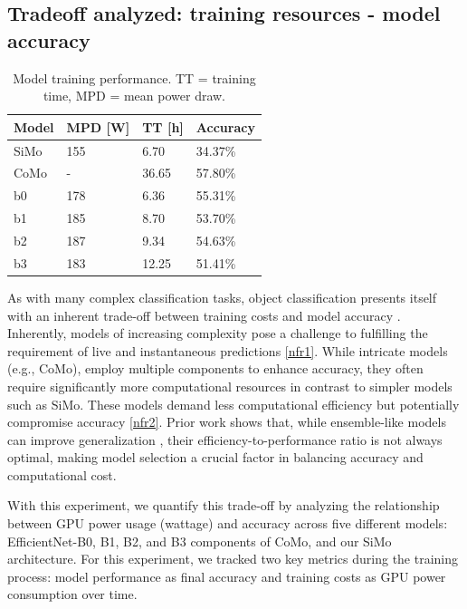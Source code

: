 \subsection{Tradeoff analyzed: training resources - model accuracy}\label{sec:experiments:exp1}

\begin{table}[t]
\centering
\caption{Model training performance. TT = training time, MPD = mean power draw.}
\label{tab:eval:power-stuff}
\begin{tabularx}{\linewidth} {XXXX}
    \toprule
    Model & MPD [W] & TT [h] & Accuracy \\
    \midrule
    SiMo  & 155              & 6.70              & 34.37\%             \\
CoMo  & -         & 36.65          & 57.80\%             \\
b0    & 178              & 6.36              & 55.31\%             \\
b1    & 185              & 8.70              & 53.70\%             \\
b2    & 187              & 9.34              & 54.63\%             \\
b3    & 183              & 12.25             & 51.41\%    \\
    \bottomrule
\end{tabularx}
\end{table}

As with many complex classification tasks, object classification presents itself with an inherent trade-off between training costs and model accuracy \cite{DBLP:conf/icml/TanL19}. Inherently, models of increasing complexity pose a challenge to fulfilling the requirement of live and instantaneous predictions \ref{nfr1}. While intricate models (e.g., CoMo), employ multiple components to enhance accuracy, they often require significantly more computational resources in contrast to simpler models such as SiMo. These models demand less computational efficiency but potentially compromise accuracy \ref{nfr2}. Prior work shows that, while ensemble-like models can improve generalization \cite{DBLP:journals/ml/Dietterich00}, their efficiency-to-performance ratio is not always optimal, making model selection a crucial factor in balancing accuracy and computational cost.

With this experiment, we quantify this trade-off by analyzing the relationship between GPU power usage (wattage) and accuracy across five different models: EfficientNet-B0, B1, B2, and B3 components of CoMo, and our SiMo architecture.  For this experiment, we tracked two key metrics during the training process: model performance as final accuracy and training costs as GPU power consumption over time.

